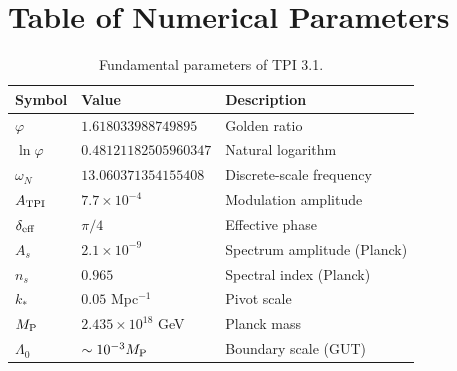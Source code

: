 \documentclass[11pt,a4paper]{article}
\theoremstyle{definition}
\begin{document}
\section{Table of Numerical Parameters}\label{app:params}

\begin{table}[h]
\centering
\begin{tabular}{@{}lll@{}}
\toprule
\textbf{Symbol} & \textbf{Value} & \textbf{Description} \\
\midrule
$\varphi$ & $1.618033988749895$ & Golden ratio \\
$\ln\varphi$ & $0.48121182505960347$ & Natural logarithm \\
$\omega_N$ & $13.060371354155408$ & Discrete-scale frequency \\
$A_{\rm TPI}$ & $7.7 \times 10^{-4}$ & Modulation amplitude \\
$\delta_{\rm eff}$ & $\pi/4$ & Effective phase \\
$A_s$ & $2.1 \times 10^{-9}$ & Spectrum amplitude (Planck) \\
$n_s$ & $0.965$ & Spectral index (Planck) \\
$k_*$ & $0.05$ Mpc$^{-1}$ & Pivot scale \\
$M_{\rm P}$ & $2.435 \times 10^{18}$ GeV & Planck mass \\
$\Lambda_0$ & $\sim 10^{-3} M_{\rm P}$ & Boundary scale (GUT) \\
\bottomrule
\end{tabular}
\caption{Fundamental parameters of TPI 3.1.}
\end{table}
\end{document}
